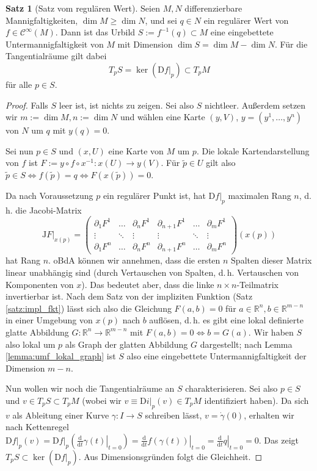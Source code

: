 \documentclass[a4paper]{scrbook}
\numberwithin{equation}{chapter}
\newcommand{\D}{\mathrm{d}}
\newcommand{\DD}{\mathrm{D}}
\newcommand{\R}{\mathbb{R}}
\newcommand{\sC}{\mathcal{C}^{\infty}}
\theoremstyle{definition}
\newtheorem{satz}[defn]{Satz}
\begin{document}
\begin{satz}[Satz vom regulären Wert]
	Seien $M,N$ differenzierbare Mannigfaltigkeiten, $\dim M \ge \dim N$, und sei $q\in N$ ein regulärer Wert von $f \in \sC(M)$. Dann ist das Urbild $S := f^{-1}({q}) \subset M$ eine eingebettete Untermannigfaltigkeit von $M$ mit Dimension $\dim S = \dim M - \dim N$. Für die Tangentialräume gilt dabei
	\[T_pS = \ker \left( \left.\DD f\right|_p \right) \subset T_pM\]
	für alle $p \in S$.

	\begin{proof}
		Falls $S$ leer ist, ist nichts zu zeigen. Sei also $S$ nichtleer. Außerdem setzen wir $m := \dim M, n := \dim N$ und wählen eine Karte $(y,V)$, $y = (y^1,\dots,y^n)$ von $N$ um $q$ mit $y(q) = 0$.

		Sei nun $p \in S$ und $(x,U)$ eine Karte von $M$ um $p$. Die lokale Kartendarstellung von $f$ ist $F := y \circ f \circ x^{-1} \colon x(U) \to y(V)$. Für $\tilde p\in U$ gilt also $\tilde p \in S \iff f(\tilde p)= q \iff F(x(\tilde p)) = 0$.

		Da nach Voraussetzung $p$ ein regulärer Punkt ist, hat $\left.\DD f\right|_p$ maximalen Rang $n$, d.\,h. die Jacobi-Matrix
		\[\left.\mathrm{J}F\right|_{x(p)} = \begin{pmatrix}
			\partial_1 F^1 & \dots & \partial_n F^1 & \partial_{n+1} F^1 & \dots & \partial_m F^1 \\
			\vdots & \ddots & \vdots & \vdots & \ddots & \vdots \\
			\partial_1 F^n & \dots & \partial_n F^n & \partial_{n+1} F^n & \dots & \partial_m F^n
		\end{pmatrix}(x(p))\]
		hat Rang $n$. oBdA können wir annehmen, dass die ersten $n$ Spalten dieser Matrix linear unabhängig sind (durch Vertauschen von Spalten, d.\,h. Vertauschen von Komponenten von $x$). Das bedeutet aber, dass die linke $n\times n$-Teilmatrix invertierbar ist. Nach dem Satz von der impliziten Funktion (Satz \ref{satz:impl_fkt}) lässt sich also die Gleichung $F(a,b) = 0$ für $a\in \R^n, b \in \R^{m-n}$ in einer Umgebung von $x(p)$ nach $b$ auflösen, d.\,h. es gibt eine lokal definierte glatte Abbildung $G\colon \R^n \to \R^{m-n}$ mit $F(a,b) = 0 \iff b = G(a)$. Wir haben $S$ also lokal um $p$ als Graph der glatten Abbildung $G$ dargestellt; nach Lemma \ref{lemma:umf_lokal_graph} ist $S$ also eine eingebettete Untermannigfaltigkeit der Dimension $m-n$.

		Nun wollen wir noch die Tangentialräume an $S$ charakterisieren. Sei also $p \in S$ und $v \in T_pS \subset T_pM$ (wobei wir $v \equiv \left.\DD i\right|_p(v) \in T_pM$ identifiziert haben). Da sich $v$ als Ableitung einer Kurve $\gamma\colon I \to S$ schreiben lässt, $v = \dot\gamma(0)$, erhalten wir nach Kettenregel $\left.\DD f\right|_p(v) = \left.\DD f\right|_p \left( \left.\frac{\D}{\D t}\gamma(t)\right|_{t=0} \right) = \left.\frac{\D}{\D t} f( \gamma(t)) \right|_{t=0} = \left.\frac{\D}{\D t} q \right|_{t=0} = 0$. Das zeigt $T_pS \subset \ker \left( \left.\DD f\right|_p \right)$. Aus Dimensionsgründen folgt die Gleichheit.
	\end{proof}
\end{satz}
\end{document}
